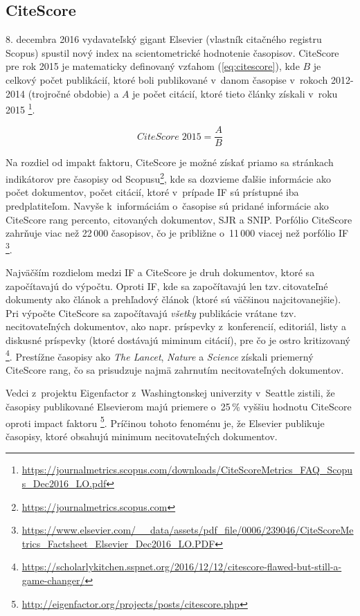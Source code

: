 \subsection{CiteScore}
\label{sec:citescore}

8. decembra 2016 vydavateľský gigant Elsevier (vlastník citačného registru
Scopus) spustil nový index na scientometrické hodnotenie časopisov.  CiteScore
pre rok 2015 je matematicky definovaný vzťahom (\ref{eq:citescore}), kde $B$
je celkový počet publikácií, ktoré boli publikované v~danom časopise v~rokoch
2012-2014 (trojročné obdobie) a $A$ je počet citácií, ktoré tieto články
získali v~roku 2015
\footnote{\url{https://journalmetrics.scopus.com/downloads/CiteScoreMetrics_FAQ_Scopus_Dec2016_LO.pdf}}.

\begin{equation}
\label{eq:citescore}
CiteScore\; 2015 = \frac{A}{B}
\end{equation}

Na rozdiel od impakt faktoru, CiteScore je možné získať priamo sa stránkach
indikátorov pre časopisy od
Scopusu\footnote{\url{https://journalmetrics.scopus.com}}, kde sa dozvieme
ďalšie informácie ako počet dokumentov, počet citácií, ktoré v~prípade IF sú
prístupné iba predplatiteľom.  Navyše k~informáciám o~časopise sú pridané
informácie ako CiteScore rang percento, citovaných dokumentov, SJR a SNIP.
Porfólio CiteScore zahrňuje viac než 22\,000 časopisov, čo je približne o~11\,000
viacej než porfólio IF
\footnote{\url{https://www.elsevier.com/__data/assets/pdf_file/0006/239046/CiteScoreMetrics_Factsheet_Elsevier_Dec2016_LO.PDF}}.

Najväčším rozdielom medzi IF a CiteScore je druh dokumentov, ktoré sa
započítavajú do výpočtu. Oproti IF, kde sa započítavajú len tzv.\,citovateľné
dokumenty ako článok a prehľadový článok (ktoré sú väčšinou najcitovanejšie).
Pri výpočte CiteScore sa započítavajú \emph{všetky} publikácie vrátane tzv.
necitovateľných dokumentov, ako napr. príspevky z~konferencií, editoriál, listy
a diskusné príspevky (ktoré dostávajú miminum citácií), pre čo je ostro
kritizovaný
\footnote{\url{https://scholarlykitchen.sspnet.org/2016/12/12/citescore-flawed-but-still-a-game-changer/}}.
Prestížne časopisy ako \emph{The Lancet}, \emph{Nature} a \emph{Science}
získali priemerný CiteScore rang, čo sa prisudzuje najmä zahrnutím
necitovateľných dokumentov.

Vedci z~projektu Eigenfactor z~Washingtonskej univerzity v~Seattle zistili, že
časopisy publikované Elsevierom majú priemere o~25\,\% vyššiu hodnotu CiteScore
oproti impact faktoru
\footnote{\url{http://eigenfactor.org/projects/posts/citescore.php}}. Príčinou
tohoto fenoménu je, že Elsevier publikuje časopisy, ktoré obsahujú minimum
necitovateľných dokumentov.

